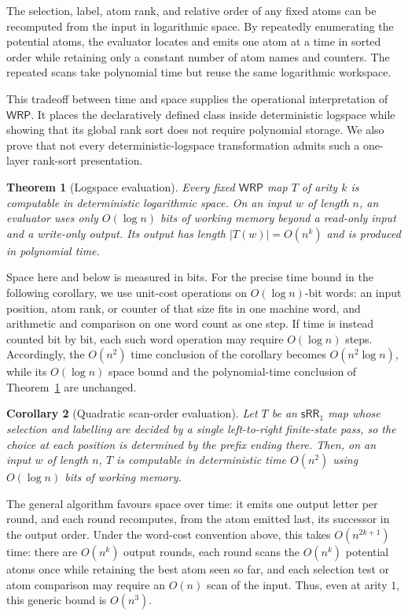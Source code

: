 \documentclass[11pt]{article}
\newtheorem{theorem}{Theorem}[section]
\newtheorem{corollary}[theorem]{Corollary}
\theoremstyle{definition}
\newcommand{\WRP}{\mathsf{WRP}}
\newcommand{\SWR}{\mathsf{sRR}_1}
\begin{document}
The selection, label, atom rank, and relative order of any fixed atoms can be
recomputed from the input in logarithmic space.  By repeatedly enumerating the
potential atoms, the evaluator locates and emits one atom at a time in sorted
order while retaining only a constant number of atom names and counters.  The
repeated scans take polynomial time but reuse the same logarithmic workspace.

This tradeoff between time and space supplies the operational interpretation
of $\WRP$.  It places the declaratively defined class inside deterministic
logspace while showing that its global rank sort does not require polynomial
storage.  We also prove that not every deterministic-logspace transformation
admits such a one-layer rank-sort presentation.

\begin{theorem}[Logspace evaluation]\label{thm:wrp-logspace}
Every fixed $\WRP$ map $T$ of arity $k$ is computable in deterministic
\emph{logarithmic space}.  On an input $w$ of length $n$, an evaluator uses
only $O(\log n)$ bits of working memory beyond a read-only input and a
write-only output.  Its output has length $|T(w)|=O(n^k)$ and is produced in
polynomial time.
\end{theorem}

Space here and below is measured in bits.  For the precise time bound in the
following corollary, we use unit-cost operations on $O(\log n)$-bit words: an
input position, atom rank, or counter of that size fits in one machine word, and
arithmetic and comparison on one word count as one step.  If time is instead
counted bit by bit, each such word operation may require $O(\log n)$ steps.
Accordingly, the $O(n^2)$ time conclusion of the corollary becomes
$O(n^2\log n)$, while its $O(\log n)$ space bound and the polynomial-time
conclusion of Theorem~\ref{thm:wrp-logspace} are unchanged.

\begin{corollary}[Quadratic scan-order evaluation]
\label{cor:srr-quadratic}
Let $T$ be an $\SWR$ map whose selection and labelling are decided by a
single left-to-right finite-state pass, so the choice at each position is
determined by the prefix ending there.  Then, on an input $w$ of length $n$,
$T$ is computable in deterministic time $O(n^2)$ using $O(\log n)$ bits of
working memory.
\end{corollary}

The general algorithm favours space over time: it emits one output letter per
round, and each round recomputes, from the atom emitted last, its successor in
the output order.  Under the word-cost convention above, this takes
$O(n^{2k+1})$ time: there are $O(n^k)$ output rounds, each round scans the
$O(n^k)$ potential atoms once while retaining the best atom seen so far,
and each selection test or atom comparison may require an $O(n)$ scan of the
input.  Thus, even at arity $1$, this generic bound is $O(n^3)$.
\end{document}
